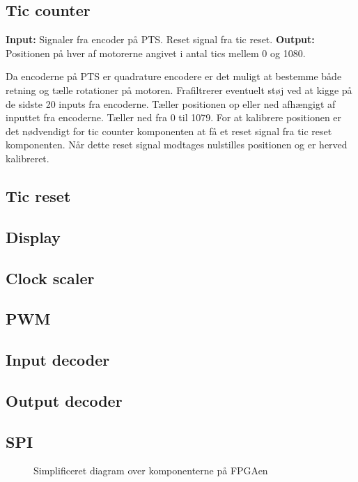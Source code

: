 \subsection*{Tic counter}
\textbf{Input:}
Signaler fra encoder på PTS. Reset signal fra tic reset.
\textbf{Output:} Positionen på hver af motorerne angivet i antal tics mellem 0 
og 1080.

Da encoderne på PTS er quadrature encodere er det muligt at bestemme både retning og 
tælle rotationer på motoren.
Frafiltrerer eventuelt støj ved at kigge på de sidste 20 inputs fra encoderne.
Tæller positionen op eller ned afhængigt af inputtet fra encoderne. 
Tæller ned fra 0 til 1079.
For at kalibrere positionen er det nødvendigt for tic counter komponenten at få 
et reset signal fra tic reset komponenten. 
Når dette reset signal modtages nulstilles positionen og er herved kalibreret.

\subsection*{Tic reset}

\subsection*{Display }

\subsection*{Clock scaler}

\subsection*{PWM}

\subsection*{Input decoder}

\subsection*{Output decoder}

\subsection*{SPI}




\begin{figure}[!th]
\centering
\begin{tikzpicture}[node distance = 5 cm,scale=1]

\end{tikzpicture}
\caption[Kom]{Simplificeret diagram over komponenterne på FPGAen}
\label{fig:FPGA_blok}
\end{figure}


